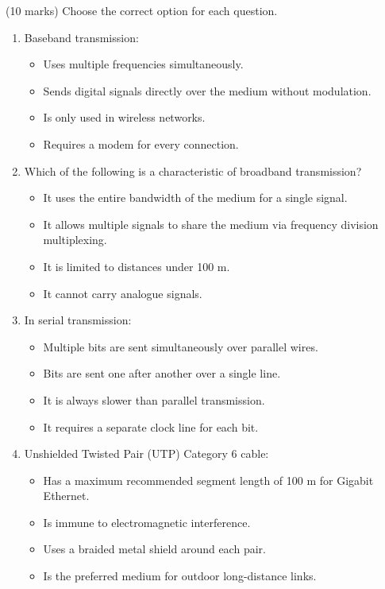\documentclass[11pt]{article}
\begin{document}
\begin{exercice} (10 marks)
Choose the correct option for each question.

\begin{enumerate}
\item Baseband transmission:
\begin{itemize}
\item[A.] Uses multiple frequencies simultaneously.
\item[B.] Sends digital signals directly over the medium without modulation.
\item[C.] Is only used in wireless networks.
\item[D.] Requires a modem for every connection.
\end{itemize}

\item Which of the following is a characteristic of broadband transmission?
\begin{itemize}
\item[A.] It uses the entire bandwidth of the medium for a single signal.
\item[B.] It allows multiple signals to share the medium via frequency division multiplexing.
\item[C.] It is limited to distances under 100 m.
\item[D.] It cannot carry analogue signals.
\end{itemize}

\item In serial transmission:
\begin{itemize}
\item[A.] Multiple bits are sent simultaneously over parallel wires.
\item[B.] Bits are sent one after another over a single line.
\item[C.] It is always slower than parallel transmission.
\item[D.] It requires a separate clock line for each bit.
\end{itemize}

\item Unshielded Twisted Pair (UTP) Category 6 cable:
\begin{itemize}
\item[A.] Has a maximum recommended segment length of 100 m for Gigabit Ethernet.
\item[B.] Is immune to electromagnetic interference.
\item[C.] Uses a braided metal shield around each pair.
\item[D.] Is the preferred medium for outdoor long-distance links.
\end{itemize}


\end{enumerate}
\end{exercice}
\end{document}
